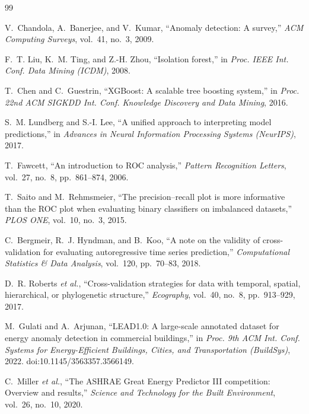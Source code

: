 \documentclass[conference]{IEEEtran}
\begin{document}
\begin{thebibliography}{99}

V.~Chandola, A.~Banerjee, and V.~Kumar, ``Anomaly detection: A survey,''
\emph{ACM Computing Surveys}, vol.~41, no.~3, 2009.

F.~T. Liu, K.~M. Ting, and Z.-H. Zhou, ``Isolation forest,'' in \emph{Proc. IEEE Int. Conf. Data
Mining (ICDM)}, 2008.

T.~Chen and C.~Guestrin, ``XGBoost: A scalable tree boosting system,'' in \emph{Proc. 22nd ACM
SIGKDD Int. Conf. Knowledge Discovery and Data Mining}, 2016.

S.~M. Lundberg and S.-I. Lee, ``A unified approach to interpreting model predictions,'' in
\emph{Advances in Neural Information Processing Systems (NeurIPS)}, 2017.

T.~Fawcett, ``An introduction to ROC analysis,'' \emph{Pattern Recognition Letters}, vol.~27, no.~8,
pp.~861--874, 2006.

T.~Saito and M.~Rehmsmeier, ``The precision--recall plot is more informative than the ROC plot when
evaluating binary classifiers on imbalanced datasets,'' \emph{PLOS ONE}, vol.~10, no.~3, 2015.

C.~Bergmeir, R.~J. Hyndman, and B.~Koo, ``A note on the validity of cross-validation for evaluating
autoregressive time series prediction,'' \emph{Computational Statistics \& Data Analysis}, vol.~120,
pp.~70--83, 2018.

D.~R. Roberts \emph{et al.}, ``Cross-validation strategies for data with temporal, spatial,
hierarchical, or phylogenetic structure,'' \emph{Ecography}, vol.~40, no.~8, pp.~913--929, 2017.

M.~Gulati and A.~Arjunan, ``LEAD1.0: A large-scale annotated dataset for energy anomaly detection in
commercial buildings,'' in \emph{Proc. 9th ACM Int. Conf. Systems for Energy-Efficient Buildings,
Cities, and Transportation (BuildSys)}, 2022.
doi:10.1145/3563357.3566149.

C.~Miller \emph{et al.}, ``The ASHRAE Great Energy Predictor III competition: Overview and results,''
\emph{Science and Technology for the Built Environment}, vol.~26, no.~10, 2020.

\end{thebibliography}
\end{document}
